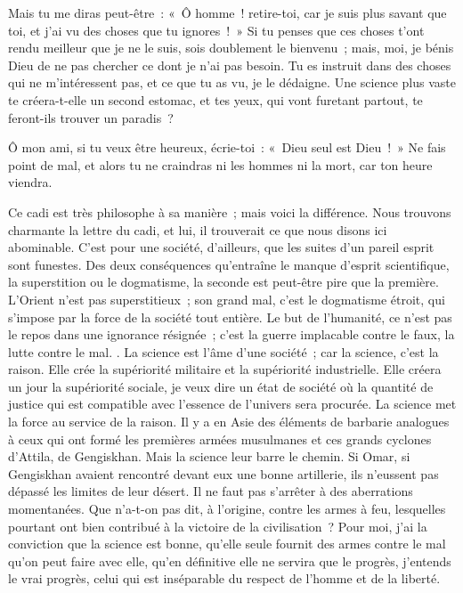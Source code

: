 \documentclass[french,twoside]{book} %
\newcommand\orgName[1]{#1}
\newcommand\persName[1]{#1}
\newcommand\placeName[1]{#1}
\newenvironment{quoteblock}%
  {\begin{quoting}}
  {\end{quoting}}
\newenvironment{quotebar}{%
    \def\FrameCommand{{\color{rubric!10!}\vrule width 0.5em} \hspace{0.9em}}%
    \def\OuterFrameSep{\itemsep} %
    \MakeFramed {\advance\hsize-\width \FrameRestore}
  }%
  {%
    \endMakeFramed
  }
\renewenvironment{quoteblock}%
  {%
    \savenotes
    \setstretch{0.9}
    \normalfont
    \begin{quotebar}
  }
  {%
    \end{quotebar}
    \spewnotes
  }
\begin{document}
\begin{quoteblock}
 Mais tu me diras peut-être : « Ô homme ! retire-toi, car je suis plus savant que toi, et j’ai vu des choses que tu ignores ! » Si tu penses que ces choses t’ont rendu meilleur que je ne le suis, sois doublement le bienvenu ; mais, moi, je bénis {\persName Dieu} de ne pas chercher ce dont je n’ai pas besoin. Tu es instruit dans des choses qui ne m’intéressent pas, et ce que tu as vu, je le dédaigne. Une science plus vaste te créera-t-elle un second estomac, et tes yeux, qui vont furetant partout, te feront-ils trouver un paradis ?\par
 Ô mon ami, si tu veux être heureux, écrie-toi : « {\persName Dieu} seul est {\persName Dieu} ! » Ne fais point de mal, et alors tu ne craindras ni les hommes ni la mort, car ton heure viendra.
 \end{quoteblock}

\noindent Ce cadi est très philosophe à sa manière ; mais voici la différence. Nous trouvons charmante la lettre du cadi, et lui, il trouverait ce que nous disons ici abominable. C’est pour une société, d’ailleurs, que les suites d’un pareil esprit sont funestes. Des deux conséquences qu’entraîne le manque d’esprit scientifique, la superstition ou le dogmatisme, la seconde est peut-être pire que la première. L’{\orgName Orient} n’est pas superstitieux ; son grand mal, c’est le dogmatisme étroit, qui s’impose par la force de la société tout entière. Le but de l’humanité, ce n’est pas le repos dans une ignorance résignée ; c’est la guerre implacable contre le faux, la lutte contre le mal. . La science est l’âme d’une société ; car la science, c’est la raison. Elle crée la supériorité militaire et la supériorité industrielle. Elle créera un jour la supériorité sociale, je veux dire un état de société où la quantité de justice qui est compatible avec l’essence de l’univers sera procurée. La science met la force au service de la raison. Il y a en {\placeName Asie} des éléments de barbarie analogues à ceux qui ont formé les premières armées musulmanes et ces grands cyclones d’{\persName Attila}, de {\persName Gengiskhan}. Mais la science leur barre le chemin. Si {\persName Omar}, si {\persName Gengiskhan} avaient rencontré devant eux une bonne artillerie, ils n’eussent pas dépassé les limites de leur désert. Il ne faut pas s’arrêter à des aberrations momentanées. Que n’a-t-on pas dit, à l’origine, contre les armes à feu, lesquelles pourtant ont bien contribué à la victoire de la civilisation ? Pour moi, j’ai la conviction que la science est bonne, qu’elle seule fournit des armes contre le mal qu’on peut faire avec elle, qu’en définitive elle ne servira que le progrès, j’entends le vrai progrès, celui qui est inséparable du respect de l’homme et de la liberté.
\end{document}
